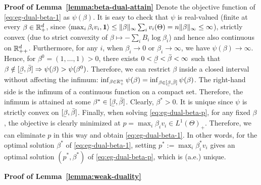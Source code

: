 	\smallskip\noindent\textbf{Proof of Lemma~\ref{lemma:beta-dual-attain}}
	Denote the objective function of \eqref{eq:eg-dual-beta-1} as $\psi(\beta)$. It is easy to check that $\psi$ is real-valued (finite at every $\beta\in \mathbb{R}^d_+$, since $\langle \max_i \beta_i v_i, \mathbf{1} \rangle \leq \|\beta\|_\infty \sum_i v_i(\Theta) = n \|\beta\|_\infty \leq \infty $), strictly convex (due to strict convexity of $\beta\mapsto -\sum_i B_i \log \beta_i$) and hence also continuous on $\mathbb{R}^d_{++}$.
	Furthermore, for any $i$, when $\beta_i\rightarrow 0$ or $\beta_i \rightarrow \infty$, we have $\psi(\beta) \rightarrow \infty$.
	Hence, for $\beta^0 = (1, \dots, 1)>0$, there exists $0 < \ubar{\beta} < \bar{\beta} < \infty$ such that 
	$\beta\notin [\ubar{\beta}, \bar{\beta}] \Rightarrow \psi(\beta) > \psi(\beta^0)$.
	Therefore, we can restrict $\beta$ inside a closed interval without affecting the infimum:
	$ \inf_{\beta\in \RR_+^n } \psi(\beta) = \inf_{\beta\in [\ubar{\beta}, \bar{\beta}] }\psi(\beta)$. 
	The right-hand side is the infimum of a continuous function on a compact set. Therefore, the infimum is attained at some $\beta^* \in [\ubar{\beta}, \bar{\beta}]$. Clearly, $\beta^* > 0$. It is unique since $\psi$ is strictly convex on $[\ubar{\beta}, \bar{\beta}]$.
	Finally, when solving \eqref{eq:eg-dual-beta-p}, for any fixed $\beta$, the objective is clearly minimized at $p = \max_i \beta_i v_i \in L^1(\Theta)_+$. Therefore, we can eliminate $p$ in this way and obtain \eqref{eq:eg-dual-beta-1}. In other words, for the optimal solution $\beta^*$ of \eqref{eq:eg-dual-beta-1}, setting $p^* := \max_i \beta^*_i v_i$ gives an optimal solution $(p^*, \beta^*)$ of \eqref{eq:eg-dual-beta-p}, which is (a.e.) unique. 

	\smallskip\noindent\textbf{Proof of Lemma~\ref{lemma:weak-duality}}

